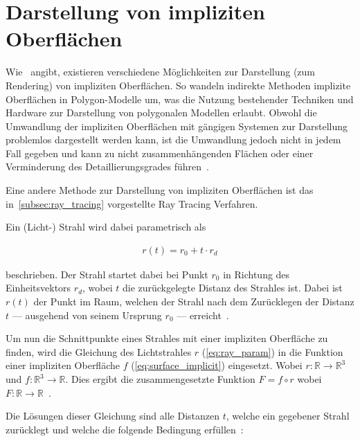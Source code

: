 
\section{Darstellung von impliziten Oberflächen}
\label{sec:description_implicit_surfaces}

Wie~\citeauthor{hart_sphere_1994} angibt, existieren verschiedene Möglichkeiten
zur Darstellung (zum Rendering) von impliziten Oberflächen. So wandeln
indirekte Methoden implizite Oberflächen in Polygon-Modelle um, was die Nutzung
bestehender Techniken und Hardware zur Darstellung von polygonalen Modellen
erlaubt. Obwohl die Umwandlung der impliziten Oberflächen mit gängigen Systemen
zur Darstellung problemlos dargestellt werden kann, ist die Umwandlung jedoch nicht
in jedem Fall gegeben und kann zu nicht zusammenhängenden Flächen oder einer
Verminderung des Detaillierungsgrades führen~\parencite[S.
528]{hart_sphere_1994}.

Eine andere Methode zur Darstellung von impliziten Oberflächen ist das
in~\autoref{subsec:ray_tracing} vorgestellte Ray Tracing Verfahren.

Ein (Licht-) Strahl wird dabei parametrisch als

\begin{gather}\label{eq:ray_param}
    r(t) = r_{0} + t \cdot r_{d}
\end{gather}

beschrieben. Der Strahl startet dabei bei Punkt $r_{0}$ in Richtung des
Einheitsvektors $r_{d}$, wobei $t$ die zurückgelegte Distanz des Strahles ist.
Dabei ist $r(t)$ der Punkt im Raum, welchen der Strahl nach dem Zurücklegen der
Distanz $t$ --- ausgehend von seinem Ursprung $r_{0}$ ---
erreicht~\parencite[S. 528]{hart_sphere_1994}.

Um nun die Schnittpunkte eines Strahles mit einer impliziten Oberfläche
zu finden, wird die Gleichung des Lichtstrahles $r$ (\ref{eq:ray_param})
in die Funktion einer impliziten Oberfläche $f$
(\ref{eq:surface_implicit}) eingesetzt. Wobei $r : \mathbb{R} \to
\mathbb{R}^{3}$ und $f : \mathbb{R}^{3} \to \mathbb{R}$. Dies ergibt die
zusammengesetzte Funktion $F = f \circ r$ wobei $F : \mathbb{R} \to
\mathbb{R}$~\parencite[S. 528]{hart_sphere_1994}.

Die Lösungen dieser Gleichung sind alle Distanzen $t$, welche ein
gegebener Strahl zurücklegt und welche die folgende Bedingung
erfüllen~\parencite[S. 528]{hart_sphere_1994}:

